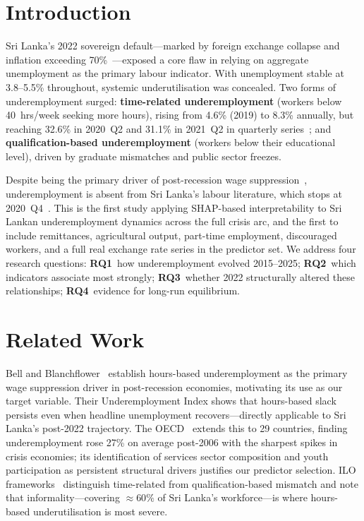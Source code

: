 \documentclass[sigconf]{acmart}
\begin{document}
\section{Introduction}

Sri Lanka's 2022 sovereign default---marked by foreign exchange collapse
and inflation exceeding 70\%~\cite{cbsl2025}---exposed a core flaw in
relying on aggregate unemployment as the primary labour indicator. With
unemployment stable at 3.8--5.5\% throughout, systemic underutilisation
was concealed. Two forms of underemployment surged: \textbf{time-related
underemployment} (workers below 40~hrs/week seeking more hours), rising
from 4.6\% (2019) to 8.3\% annually, but reaching 32.6\% in 2020~Q2 and
31.1\% in 2021~Q2 in quarterly series~\cite{dcs2025}; and
\textbf{qualification-based underemployment} (workers below their
educational level), driven by graduate mismatches and public sector
freezes.

Despite being the primary driver of post-recession wage
suppression~\cite{bell2018underemployment}, underemployment is absent from
Sri Lanka's labour literature, which stops at 2020~Q4~\cite{pabasara2025impact}.
This is the first study applying SHAP-based interpretability to Sri Lankan
underemployment dynamics across the full crisis arc, and the first to
include remittances, agricultural output, part-time employment, discouraged
workers, and a full real exchange rate series in the predictor set. We
address four research questions: \textbf{RQ1}~how underemployment evolved
2015--2025; \textbf{RQ2}~which indicators associate most strongly;
\textbf{RQ3}~whether 2022 structurally altered these relationships;
\textbf{RQ4}~evidence for long-run equilibrium.

\section{Related Work}

Bell and Blanchflower~\cite{bell2018underemployment} establish hours-based
underemployment as the primary wage suppression driver in post-recession
economies, motivating its use as our target variable. Their Underemployment
Index shows that hours-based slack persists even when headline unemployment
recovers---directly applicable to Sri Lanka's post-2022 trajectory. The
OECD~\cite{oecd2017} extends this to 29 countries, finding underemployment
rose 27\% on average post-2006 with the sharpest spikes in crisis economies;
its identification of services sector composition and youth participation as
persistent structural drivers justifies our predictor selection. ILO
frameworks~\cite{ilo2013,iloweso2024} distinguish time-related from
qualification-based mismatch and note that informality---covering
${\approx}60\%$ of Sri Lanka's workforce---is where hours-based
underutilisation is most severe.
\end{document}
